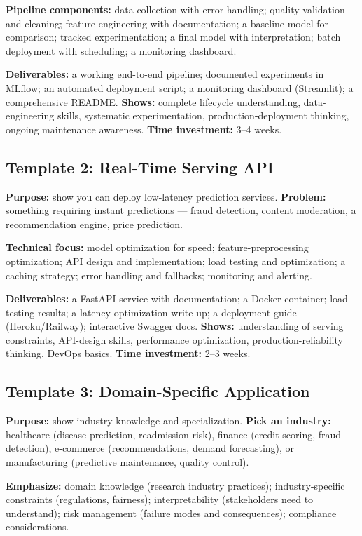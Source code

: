 \textbf{Pipeline components:} data collection with error handling; quality validation and cleaning; feature
engineering with documentation; a baseline model for comparison; tracked experimentation; a final model with
interpretation; batch deployment with scheduling; a monitoring dashboard.

\textbf{Deliverables:} a working end-to-end pipeline; documented experiments in MLflow; an automated deployment
script; a monitoring dashboard (Streamlit); a comprehensive README. \textbf{Shows:} complete lifecycle
understanding, data-engineering skills, systematic experimentation, production-deployment thinking, ongoing
maintenance awareness. \textbf{Time investment:} 3--4 weeks.

\subsection{Template 2: Real-Time Serving API}
\textbf{Purpose:} show you can deploy low-latency prediction services. \textbf{Problem:} something requiring
instant predictions --- fraud detection, content moderation, a recommendation engine, price prediction.

\textbf{Technical focus:} model optimization for speed; feature-preprocessing optimization; API design and
implementation; load testing and optimization; a caching strategy; error handling and fallbacks; monitoring and
alerting.

\textbf{Deliverables:} a FastAPI service with documentation; a Docker container; load-testing results; a
latency-optimization write-up; a deployment guide (Heroku/Railway); interactive Swagger docs. \textbf{Shows:}
understanding of serving constraints, API-design skills, performance optimization, production-reliability
thinking, DevOps basics. \textbf{Time investment:} 2--3 weeks.

\subsection{Template 3: Domain-Specific Application}
\textbf{Purpose:} show industry knowledge and specialization. \textbf{Pick an industry:} healthcare (disease
prediction, readmission risk), finance (credit scoring, fraud detection), e-commerce (recommendations, demand
forecasting), or manufacturing (predictive maintenance, quality control).

\textbf{Emphasize:} domain knowledge (research industry practices); industry-specific constraints (regulations,
fairness); interpretability (stakeholders need to understand); risk management (failure modes and consequences);
compliance considerations.

